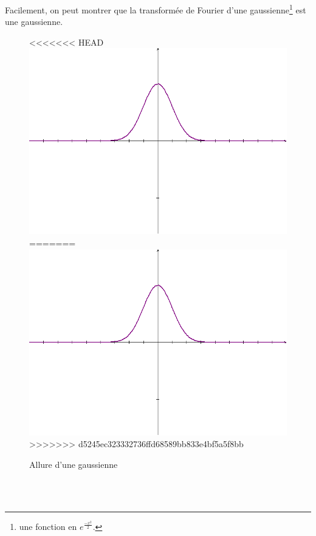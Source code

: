 Facilement, on peut montrer que la transformée de Fourier d'une gaussienne\footnote{une fonction en $e^{\frac{-x^2}{2}}$.} est une gaussienne.
\begin{figure}[!h]
\centering
<<<<<<< HEAD
\includegraphics[scale=0.3]{gaussienne.png}
=======
\includegraphics[scale=0.3]{images/gaussienne.png}
>>>>>>> d5245ec323332736ffd68589bb833e4bf5a5f8bb
\caption{Allure d'une gaussienne}
\end{figure} \\ \\

